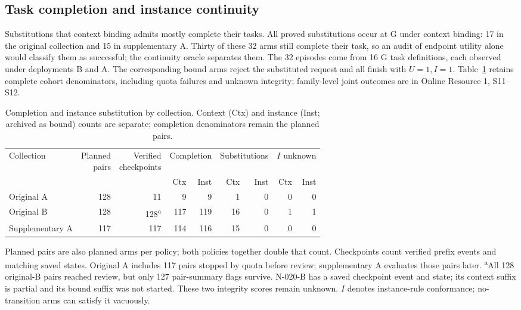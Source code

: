 \documentclass[pdflatex,sn-basic]{sn-jnl}
\begin{document}
\subsection{Task completion and instance continuity}\label{continuity-and-task-completion}

Substitutions that context binding admits mostly complete their tasks. All proved substitutions occur at G under context binding: 17 in the original collection and 15 in supplementary A. Thirty of these 32 arms still complete their task, so an audit of endpoint utility alone would classify them as successful; the continuity oracle separates them. The 32 episodes come from 16 G task definitions, each observed under deployments B and A. The corresponding bound arms reject the substituted request and all finish with \(U=1,I=1\). Table~\ref{tab:outcomes} retains complete cohort denominators, including quota failures and unknown integrity; family-level joint outcomes are in Online Resource 1, S11--S12.

\begin{table}[tbp]
\caption{Completion and instance substitution by collection. Context (Ctx) and instance (Inst; archived as bound) counts are separate; completion denominators remain the planned pairs.}\label{tab:outcomes}
\centering\small
\setlength{\tabcolsep}{2pt}
\begin{tabular*}{\textwidth}{@{\extracolsep{\fill}}lrrrrrrrr@{}}
\toprule
Collection & \shortstack{Planned\\pairs} & \shortstack{Verified\\checkpoints} & \multicolumn{2}{c}{Completion} & \multicolumn{2}{c}{Substitutions} & \multicolumn{2}{c}{$I$ unknown} \\
\cmidrule(lr){4-5}\cmidrule(lr){6-7}\cmidrule(lr){8-9}
 & & & Ctx & Inst & Ctx & Inst & Ctx & Inst \\
\midrule
Original A & 128 & 11 & 9 & 9 & 1 & 0 & 0 & 0 \\
Original B & 128 & 128\textsuperscript{a} & 117 & 119 & 16 & 0 & 1 & 1 \\
Supplementary A & 117 & 117 & 114 & 116 & 15 & 0 & 0 & 0 \\
\bottomrule
\end{tabular*}
\par\smallskip\begin{minipage}{\textwidth}\small Planned pairs are also planned arms per policy; both policies together double that count. Checkpoints count verified prefix events and matching saved states. Original A includes 117 pairs stopped by quota before review; supplementary A evaluates those pairs later. \textsuperscript{a}All 128 original-B pairs reached review, but only 127 pair-summary flags survive. N-020-B has a saved checkpoint event and state; its context suffix is partial and its bound suffix was not started. These two integrity scores remain unknown. $I$ denotes instance-rule conformance; no-transition arms can satisfy it vacuously.\end{minipage}
\end{table}
\end{document}
